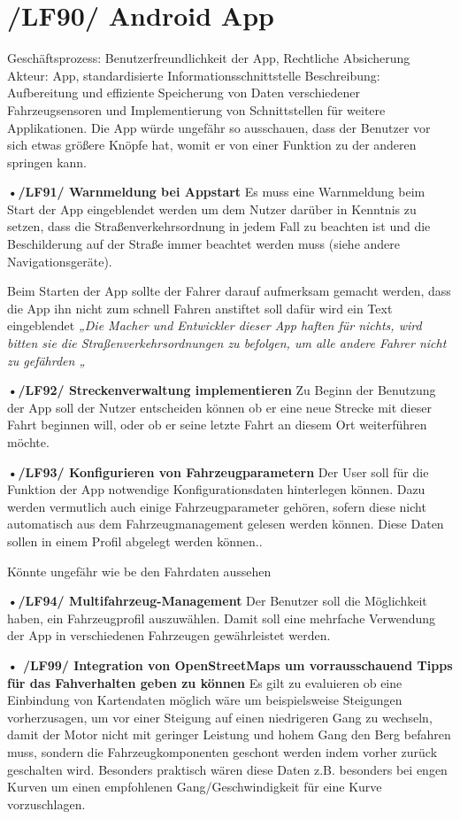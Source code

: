 \newpage

\section{/LF90/ Android App}
Geschäftsprozess:	Benutzerfreundlichkeit der App, Rechtliche Absicherung
Akteur:			App, standardisierte Informationsschnittstelle
Beschreibung:	Aufbereitung und effiziente Speicherung von Daten verschiedener Fahrzeugsensoren und Implementierung von Schnittstellen für weitere Applikationen. 
Die App würde ungefähr so ausschauen, dass der Benutzer vor sich etwas größere Knöpfe hat,                                        
womit er von einer Funktion zu der anderen springen kann.

\textbf{•/LF91/ Warnmeldung bei Appstart}
\nextline
Es muss eine Warnmeldung beim Start der App eingeblendet werden um dem Nutzer darüber in Kenntnis zu setzen, dass die Straßenverkehrsordnung in jedem Fall zu beachten ist und die Beschilderung auf der Straße immer beachtet werden muss (siehe andere Navigationsgeräte).

Beim Starten der App sollte der Fahrer darauf aufmerksam gemacht werden, dass die App ihn nicht zum schnell Fahren anstiftet soll dafür wird ein Text eingeblendet
\emph{„Die Macher und Entwickler dieser App haften für nichts, wird bitten sie die Straßenverkehrsordnungen zu befolgen, um alle andere Fahrer nicht zu gefährden „}

\textbf{•/LF92/ Streckenverwaltung implementieren}
\nextline
Zu Beginn der Benutzung der App soll der Nutzer entscheiden können ob er eine neue Strecke mit dieser Fahrt beginnen will, oder ob er seine letzte Fahrt an diesem Ort weiterführen möchte.

\textbf{•/LF93/ Konfigurieren von Fahrzeugparametern}
\nextline
Der User soll für die Funktion der App notwendige Konfigurationsdaten hinterlegen können. Dazu werden vermutlich auch einige Fahrzeugparameter gehören, sofern diese nicht automatisch aus dem Fahrzeugmanagement gelesen werden können. Diese Daten sollen in einem Profil abgelegt werden können..

Könnte ungefähr wie be den Fahrdaten aussehen 

\textbf{•/LF94/ Multifahrzeug-Management}
\nextline
Der Benutzer soll die Möglichkeit haben, ein Fahrzeugprofil auszuwählen. Damit soll eine mehrfache Verwendung der App in verschiedenen Fahrzeugen gewährleistet werden.

\textbf{• /LF99/ Integration von OpenStreetMaps um vorrausschauend Tipps für das Fahverhalten geben zu können}
\nextline
Es gilt zu evaluieren ob eine Einbindung von Kartendaten möglich wäre um beispielsweise Steigungen vorherzusagen, um vor einer Steigung auf einen niedrigeren Gang zu wechseln, damit der Motor nicht mit geringer Leistung und hohem Gang den Berg befahren muss, sondern die Fahrzeugkomponenten geschont werden indem vorher zurück geschalten wird. Besonders praktisch wären diese Daten z.B. besonders bei engen Kurven um einen empfohlenen Gang/Geschwindigkeit für eine Kurve vorzuschlagen.
